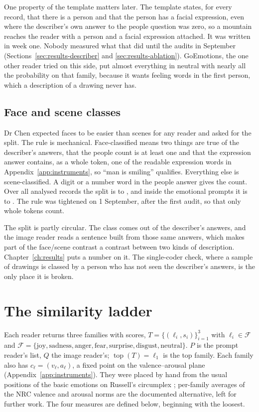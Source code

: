One property of the template matters later. The template states, for every record, that there is a person and that the person has a facial expression, even where the describer's own answer to the people question was zero, so a mountain reaches the reader with a person and a facial expression attached. It was written in week one. Nobody measured what that did until the audits in September (Sections~\ref{sec:results-describer} and \ref{sec:results-ablation}). GoEmotions, the one other reader tried on this side, put almost everything in neutral with nearly all the probability on that family, because it wants feeling words in the first person, which a description of a drawing never has.

\subsection{Face and scene classes}

Dr Chen expected faces to be easier than scenes for any reader and asked for the split. The rule is mechanical. Face-classified means two things are true of the describer's answers, that the people count is at least one and that the expression answer contains, as a whole token, one of the readable expression words in Appendix~\ref{app:instruments}, so ``man is smiling'' qualifies. Everything else is scene-classified. A digit or a number word in the people answer gives the count. Over all \nAnalysed{} analysed records the split is \nFaceAll{} to \nSceneAll{}, and inside the emotional prompts it is \nFaceEmo{} to \nSceneEmo{}. The rule was tightened on 1 September, after the first audit, so that only whole tokens count.

The split is partly circular. The class comes out of the describer's answers, and the image reader reads a sentence built from those same answers, which makes part of the face/scene contrast a contrast between two kinds of description. Chapter~\ref{ch:results} puts a number on it. The single-coder check, where a sample of drawings is classed by a person who has not seen the describer's answers, is the only place it is broken.

\section{The similarity ladder}
\label{sec:method-measures}

Each reader returns three families with scores, $T = \{(\ell_i, s_i)\}_{i=1}^{3}$ with $\ell_i \in \mathcal{F}$ and $\mathcal{F} = \{\text{joy}, \text{sadness}, \text{anger}, \text{fear}, \text{surprise}, \text{disgust}, \text{neutral}\}$. $P$ is the prompt reader's list, $Q$ the image reader's; $\operatorname{top}(T) = \ell_1$ is the top family. Each family also has $c_\ell = (v_\ell, a_\ell)$, a fixed point on the valence--arousal plane (Appendix~\ref{app:instruments}). They were placed by hand from the usual positions of the basic emotions on Russell's circumplex \cite{russell1980circumplex}; per-family averages of the NRC valence and arousal norms \cite{mohammad2018obtaining} are the documented alternative, left for further work. The four measures are defined below, beginning with the loosest.

